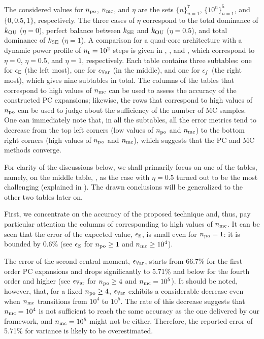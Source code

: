 The considered values for ${n_\text{po}}$, ${n_\text{mc}}$, and $\eta$ are the sets $\{ n \}_{n = 1}^7$, $\{ 10^n \}_{n = 1}^5$, and $\{ 0, 0.5, 1 \}$, respectively.
The three cases of $\eta$ correspond to the total dominance of $\fCorr_\OU$ ($\eta = 0$), perfect balance between $\fCorr_\SE$ and $\fCorr_\OU$ ($\eta = 0.5$), and total dominance of $\fCorr_\SE$ ($\eta = 1$).
A comparison for a quad-core architecture with a dynamic power profile of ${n_\text{t}} = 10^2$ steps is given in , , and , which correspond to $\eta = 0$, $\eta = 0.5$, and $\eta = 1$, respectively.
Each table contains three subtables: one for $\epsilon_\mathbb{E}$ (the left most), one for $\epsilon_{\mathbb{V}\text{ar}}$ (in the middle), and one for $\epsilon_f$ (the right most), which gives nine subtables in total.
The columns of the tables that correspond to high values of ${n_\text{mc}}$ can be used to assess the accuracy of the constructed PC expansions; likewise, the rows that correspond to high values of ${n_\text{po}}$ can be used to judge about the sufficiency of the number of MC samples.
One can immediately note that, in all the subtables, all the error metrics tend to decrease from the top left corners (low values of ${n_\text{po}}$ and ${n_\text{mc}}$) to the bottom right corners (high values of ${n_\text{po}}$ and ${n_\text{mc}}$), which suggests that the PC and MC methods converge.

For clarity of the discussions below, we shall primarily focus on one of the tables, namely, on the middle table, , as the case with $\eta = 0.5$ turned out to be the most challenging (explained in ).
The drawn conclusions will be generalized to the other two tables later on.



First, we concentrate on the accuracy of the proposed technique and, thus, pay particular attention the columns of  corresponding to high values of ${n_\text{mc}}$.
It can be seen that the error of the expected value, $\epsilon_\mathbb{E}$, is small even for ${n_\text{po}} = 1$: it is bounded by 0.6\% (see $\epsilon_\mathbb{E}$ for ${n_\text{po}} \geq 1$ and ${n_\text{mc}} \geq 10^4$).

The error of the second central moment, $\epsilon_{\mathbb{V}\text{ar}}$, starts from 66.7\% for the first-order PC expansions and drops significantly to 5.71\% and below for the fourth order and higher (see $\epsilon_{\mathbb{V}\text{ar}}$ for ${n_\text{po}} \geq 4$ and ${n_\text{mc}} = 10^5$).
It should be noted, however, that, for a fixed ${n_\text{po}} \geq 4$, $\epsilon_{\mathbb{V}\text{ar}}$ exhibits a considerable decrease even when ${n_\text{mc}}$ transitions from $10^4$ to $10^5$.
The rate of this decrease suggests that ${n_\text{mc}} = 10^4$ is not sufficient to reach the same accuracy as the one delivered by our framework, and ${n_\text{mc}} = 10^5$ might not be either.
Therefore, the reported error of 5.71\% for variance is likely to be overestimated.


